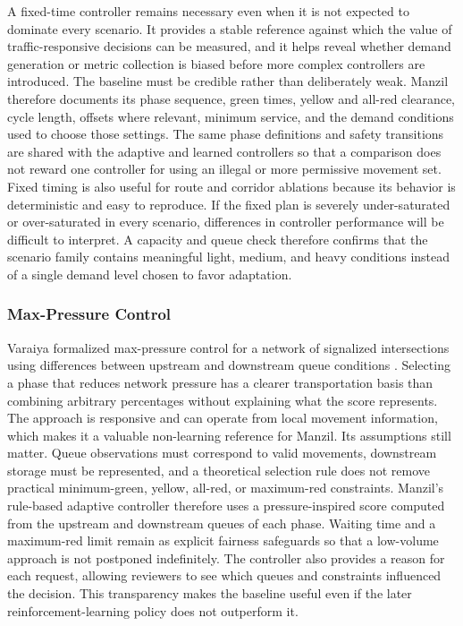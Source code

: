 A fixed-time controller remains necessary even when it is not expected to dominate every scenario. It provides a stable reference against which the value of traffic-responsive decisions can be measured, and it helps reveal whether demand generation or metric collection is biased before more complex controllers are introduced. The baseline must be credible rather than deliberately weak. Manzil therefore documents its phase sequence, green times, yellow and all-red clearance, cycle length, offsets where relevant, minimum service, and the demand conditions used to choose those settings. The same phase definitions and safety transitions are shared with the adaptive and learned controllers so that a comparison does not reward one controller for using an illegal or more permissive movement set. Fixed timing is also useful for route and corridor ablations because its behavior is deterministic and easy to reproduce. If the fixed plan is severely under-saturated or over-saturated in every scenario, differences in controller performance will be difficult to interpret. A capacity and queue check therefore confirms that the scenario family contains meaningful light, medium, and heavy conditions instead of a single demand level chosen to favor adaptation.

\subsubsection{Max-Pressure Control}

Varaiya formalized max-pressure control for a network of signalized intersections using differences between upstream and downstream queue conditions \cite{varaiya2013maxpressure}. Selecting a phase that reduces network pressure has a clearer transportation basis than combining arbitrary percentages without explaining what the score represents. The approach is responsive and can operate from local movement information, which makes it a valuable non-learning reference for Manzil. Its assumptions still matter. Queue observations must correspond to valid movements, downstream storage must be represented, and a theoretical selection rule does not remove practical minimum-green, yellow, all-red, or maximum-red constraints. Manzil's rule-based adaptive controller therefore uses a pressure-inspired score computed from the upstream and downstream queues of each phase. Waiting time and a maximum-red limit remain as explicit fairness safeguards so that a low-volume approach is not postponed indefinitely. The controller also provides a reason for each request, allowing reviewers to see which queues and constraints influenced the decision. This transparency makes the baseline useful even if the later reinforcement-learning policy does not outperform it.

